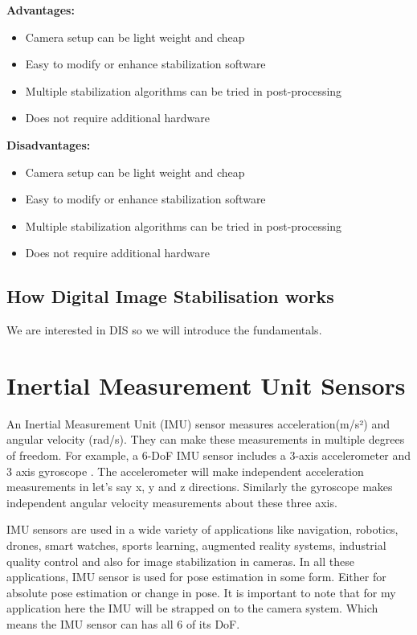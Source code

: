 \textbf{Advantages:}
\begin{itemize}
\item Camera setup can be light weight and cheap
\item Easy to modify or enhance stabilization software
\item Multiple stabilization algorithms can be tried in post-processing
\item Does not require additional hardware
\end{itemize}

\textbf{Disadvantages:}
\begin{itemize}
\item Camera setup can be light weight and cheap
\item Easy to modify or enhance stabilization software
\item Multiple stabilization algorithms can be tried in post-processing
\item Does not require additional hardware
\end{itemize}

\subsection{How Digital Image Stabilisation works}
We are interested in DIS so we will introduce the fundamentals.

\section{Inertial Measurement Unit Sensors}
An Inertial Measurement Unit (IMU) sensor measures acceleration(m/s²) and angular velocity (rad/s).  They can make these measurements in multiple degrees of freedom. For example, a 6-DoF IMU sensor includes a 3-axis accelerometer and 3 axis gyroscope  \citet{constant2021data}. The accelerometer will make independent acceleration measurements in let's say x, y and z directions. Similarly the gyroscope makes independent angular velocity measurements about these three axis.

IMU sensors are used in a wide variety of applications like navigation, robotics, drones, smart watches, sports learning, augmented reality systems, industrial quality control\citet{ahmad2013reviews}  and also for image stabilization in cameras. In all these applications, IMU sensor is used for pose estimation in some form. Either for absolute pose estimation or change in pose. It is important to note that for my application here the IMU will be strapped on to the camera system. Which means the IMU sensor can has all 6 of its DoF.

